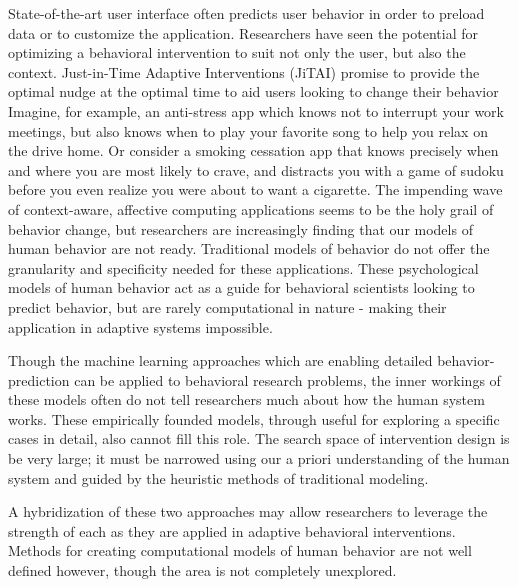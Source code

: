 \documentclass[conference]{IEEEtran}
\begin{document}
State-of-the-art user interface often predicts user behavior in order to preload data or to customize the application.
Researchers have seen the potential for optimizing a behavioral intervention to suit not only the user, but also the context. 
Just-in-Time Adaptive Interventions (JiTAI) promise to provide the optimal nudge at the optimal time to aid users looking to change their behavior
Imagine, for example, an anti-stress app which knows not to interrupt your work meetings, but also knows when to play your favorite song to help you relax on the drive home.
Or consider a smoking cessation app that knows precisely when and where you are most likely to crave, and distracts you with a game of sudoku before you even realize you were about to want a cigarette.
The impending wave of context-aware, affective computing applications seems to be the holy grail of behavior change, but researchers are increasingly finding that our models of human behavior are not ready.
Traditional models of behavior do not offer the granularity and specificity needed for these applications.
These psychological models of human behavior act as a guide for behavioral scientists looking to predict behavior, but are rarely computational in nature - making their application in adaptive systems impossible.

Though the machine learning approaches which are enabling detailed behavior-prediction can be applied to behavioral research problems, the inner workings of these models often do not tell researchers much about how the human system works. 
These empirically founded models, through useful for exploring a specific cases in detail, also cannot fill this role.
The search space of intervention design is be very large; it must be narrowed using our a priori understanding of the human system and guided by the heuristic methods of traditional modeling.

A hybridization of these two approaches may allow researchers to leverage the strength of each as they are applied in adaptive behavioral interventions.
Methods for creating computational models of human behavior are not well defined however, though the area is not completely unexplored.
\end{document}
